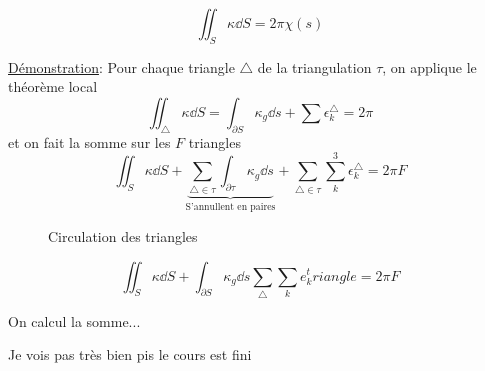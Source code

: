 $$\iint_S \kappa \dd S = 2\pi \chi(s)$$ 

\underline{Démonstration}: Pour chaque triangle $\triangle$ de la triangulation $\tau$, on applique le théorème local $$\iint_{\triangle} \kappa \dd S = \int_{\partial S} \kappa_g \dd s+ \sum \epsilon_k^\triangle = 2\pi $$ et on fait la somme sur les $F$ triangles $$\iint_S \kappa \dd S + \underbrace{\sum_{\triangle\in\tau} \int_{\partial\tau} \kappa_g \dd s}_{\text{S'annullent en paires} }   + \sum_{\triangle\in\tau} \sum_k^3 \epsilon_k^\triangle = 2 \pi F$$  

\begin{figure}[ht]
    \centering
    \caption{Circulation des triangles}
    \label{fig:circulation-des-triangles}
\end{figure}


$$\iint_S \kappa \dd S + \int_{\partial S} \kappa_g \dd s \sum_{\triangle} \sum_k e_k^triangle =2 \pi F $$

On calcul la somme...

Je vois pas très bien pis le cours est fini


